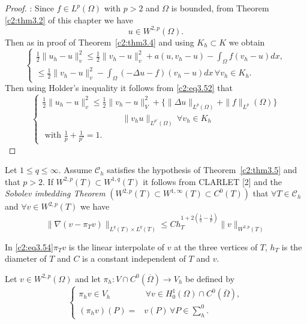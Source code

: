 \begin{proof}:
Since $f \in L^p(\Omega)$ with $p>2$ and $\Omega$ is bounded,
from Theorem \ref{c2:thm3.2} of this chapter we have  
$$
u \in W^{2, p}(\Omega).
$$
Then as in proof of Theorem~\ref{c2:thm3.4} and using $K_h \subset K$
we obtain   
\begin{equation}
\begin{cases}
\frac{1}{2}\parallel u_h - u\parallel^2_v \leq \frac{1}{2} \parallel v_h -u\parallel^2_v + a (u, v_h
- u) - \int_\Omega f (v_h - u) dx,\\ 
\leq \frac{1}{2} \parallel v_h - u\parallel^2_v - \int_\Omega (-\Delta u-f) (v_h-u)
dx\, \forall  v_h \in K_h. \tag{3.52}\label{c2:eq3.52} 
\end{cases}
\end{equation} 
Then using Holder's inequality it follows from \eqref{c2:eq3.52} that  
\begin{equation}
\begin{cases}
\frac{1}{2}\parallel u_h - u\parallel^2_v \leq \frac{1}{2}\parallel
v_h - u\parallel^2_V + \{ 
\parallel \Delta u\parallel_{L^p(\Omega)}+ \parallel f\parallel_{L^p}
(\Omega)\}\\ 
\hspace{4cm}\parallel v_h 
u\parallel_{L^{p'}(\Omega)}\, \forall  v_h \in K_h\\ 
\text{ with } \frac{1}{p} + \frac{1}{p'} = 1. \tag{3.53}\label{c2:eq3.53}
\end{cases}
\end{equation} 
\end{proof} 
 
Let $1 \leq q \leq \infty$. Assume $\mathscr{C}_h$ satisfies  the
hypothesis of Theorem~\ref{c2:thm3.5} and that $p>2$. If $W^{2, p}(T) \subset
W^{1, q}(T)$ it follows from CLARLET [2] and the \textit{Sobolev
  imbedding Theorem} $(W^{2, p}(T) \subset  W^{1, \infty} (T) \subset
C^0 (T))$ that $\forall T \in \mathscr{C}_h$ and $\forall v
\in W^{2, p}(T)$ we have    
\begin{equation}
\parallel \nabla (v - \pi_T v)\parallel_{L^q(T)\times L^q (T)} \leq C h_T^{1
+ 2 (\frac{1}{q}-\frac{1}{p})} \parallel v\parallel_{W^{2, p}(T)} \tag{3.54}\label{c2:eq3.54} 
\end{equation}  

 In \eqref{c2:eq3.54}\pageoriginale  $\pi_T v$  is the linear interpolate of $v$ at the  three vertices of $T$, $h_T$ is the diameter of $T$ and $C$ is a constant 
 independent of $T$ and $v$.  
  
Let $v \in W^{2, p}(\Omega)$ and let $\pi_h: V \cap C^0
(\overline{\Omega}) \to V_h$ be defined by  
\begin{equation*}
\begin{cases}
\pi_h v \in V_h  &\, \forall  v \in H^1_0 (\Omega) \cap C^0 (\overline{\Omega}),\\
(\pi_h v) (P) = & v (P)\, \forall  P \in \sum^0_h .
\end{cases}
\end{equation*}
 
